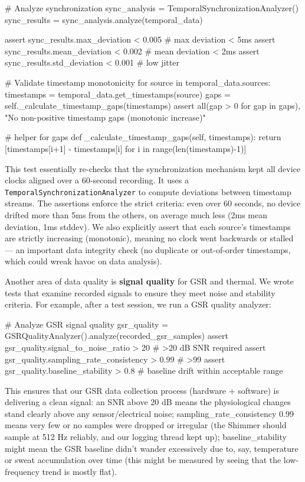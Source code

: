             # Analyze synchronization
            sync_analysis = TemporalSynchronizationAnalyzer()
            sync_results = sync_analysis.analyze(temporal_data)

            assert sync_results.max_deviation < 0.005  # max deviation < 5ms
            assert sync_results.mean_deviation < 0.002  # mean deviation < 2ms
            assert sync_results.std_deviation < 0.001  # low jitter

            # Validate timestamp monotonicity
            for source in temporal_data.sources:
                timestamps = temporal_data.get_timestamps(source)
                gaps = self._calculate_timestamp_gaps(timestamps)
                assert all(gap > 0 for gap in gaps), "No non-positive timestamp gaps (monotonic increase)"

        # helper for gaps
        def _calculate_timestamp_gaps(self, timestamps):
            return [timestamps[i+1] - timestamps[i] for i in range(len(timestamps)-1)]

This test essentially re-checks that the synchronization mechanism kept
all device clocks aligned over a 60-second recording. It uses a
\texttt{TemporalSynchronizationAnalyzer} to compute deviations between
timestamp streams. The assertions enforce the strict criteria: even over
60 seconds, no device drifted more than 5ms from the others, on average
much less (2ms mean deviation, 1ms stddev). We also explicitly assert
that each source's timestamps are strictly increasing (monotonic),
meaning no clock went backwards or stalled --- an important data
integrity check (no duplicate or out-of-order timestamps, which could
wreak havoc on data analysis).

Another area of data quality is \textbf{signal quality} for GSR and thermal.
We wrote tests that examine recorded signals to ensure they meet noise
and stability criteria. For example, after a test session, we run a GSR
quality analyzer:

    # Analyze GSR signal quality
    gsr_quality = GSRQualityAnalyzer().analyze(recorded_gsr_samples)
    assert gsr_quality.signal_to_noise_ratio > 20  # >20 dB SNR required
    assert gsr_quality.sampling_rate_consistency > 0.99  # >99%
    assert gsr_quality.baseline_stability > 0.8  # baseline drift within acceptable range

This ensures that our GSR data collection process (hardware + software)
is delivering a clean signal: an SNR above 20 dB means the physiological
changes stand clearly above any sensor/electrical noise;
sampling_rate_consistency 0.99 means very few or no samples were dropped
or irregular (the Shimmer should sample at 512 Hz reliably, and our
logging thread kept up); baseline_stability  might mean the GSR
baseline didn't wander excessively due to, say, temperature or sweat
accumulation over time (this might be measured by seeing that the
low-frequency trend is mostly flat).

